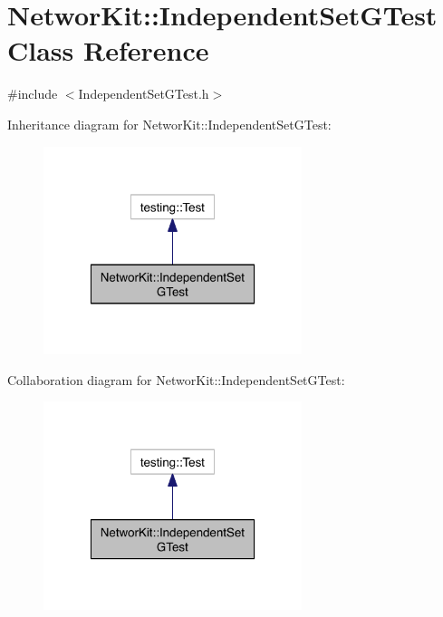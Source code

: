 \hypertarget{class_networ_kit_1_1_independent_set_g_test}{\section{Networ\-Kit\-:\-:Independent\-Set\-G\-Test Class Reference}
\label{class_networ_kit_1_1_independent_set_g_test}
}


{\ttfamily \#include $<$Independent\-Set\-G\-Test.\-h$>$}



Inheritance diagram for Networ\-Kit\-:\-:Independent\-Set\-G\-Test\-:\nopagebreak
\begin{figure}[H]
\begin{center}
\leavevmode
\includegraphics[width=214pt]{class_networ_kit_1_1_independent_set_g_test__inherit__graph}
\end{center}
\end{figure}


Collaboration diagram for Networ\-Kit\-:\-:Independent\-Set\-G\-Test\-:\nopagebreak
\begin{figure}[H]
\begin{center}
\leavevmode
\includegraphics[width=214pt]{class_networ_kit_1_1_independent_set_g_test__coll__graph}
\end{center}
\end{figure}
